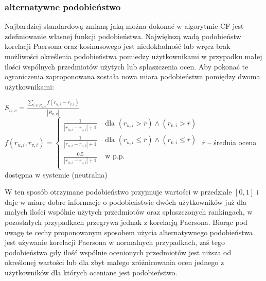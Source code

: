 \documentclass{pracamgr}
\begin{document}
    \subsubsection{alternatywne podobieństwo}
     Najbardziej standardową zmianą jaką można dokonać w algorytmie CF jest zdefiniowanie własnej funkcji podobieństwa.\newline
     Największą wadą podobieństw korelacji Paersona oraz kosinusowego jest niedokładność lub wręcz brak możliwości określenia podobieństwa pomiedzy użytkownikami
     w przypadku małej ilości wspólnych przedmiotów użytych lub spłaszczenia ocen.
     Aby pokonać te ograniczenia zaproponowana została nowa miara podobieństwa pomiędzy dwoma użytkownikami:\newline
     \begin{center}
      $S_{u,v}=\frac{\sum\limits_{i\in R_{u,v}}f(r_{u,i}-r_{v,i})}{|R_{u,v}|}$\newline
      $f(r_{u,i},r_{v,i})=\left\{\begin{array}{cc}
                                 \frac{1}{|r_{u,i}-r_{v,i}|+1}& \text{ dla } (r_{u,i}>\overline{r})\wedge(r_{v,i}>\overline{r})\\
                                 \frac{1}{|r_{u,i}-r_{v,i}|+1}& \text{ dla } (r_{u,i}\le\overline{r})\wedge(r_{v,i}\le\overline{r})\\
                                 \frac{0.5}{|r_{u,i}-r_{v,i}|+1}& \text{ w p.p.}\\
                                \end{array}\right.$\newline
     {\scriptsize
     $\overline{r}$ -- średnia ocena dostępna w systemie (neutralna)
     }\newline    
     \end{center}
     W ten sposób otrzymane podobieństwo przyjmuje wartości w przedziale $[0,1]$ i daje w miarę dobre informacje o podobieństwie dwóch użytkowników
     już dla małych ilości wspólnie użytych przedmiotów oraz spłaszczonych rankingach,
     w pozostałych przypadkach przegrywa jednak z korelacją Paersona.\newline
     Biorąc pod uwagę te cechy proponowanym sposobem użycia alternatywnego podobieństwa jest używanie korelacji Paersona w normalnych przypadkach,
     zaś tego podobieństwa gdy ilość wspólnie ocenionych przedmiotów jest niższa od określonej wartości lub dla zbyt małego zróżnicowania ocen
     jednego z użytkowników dla których oceniane jest podobieństwo.
\end{document}
